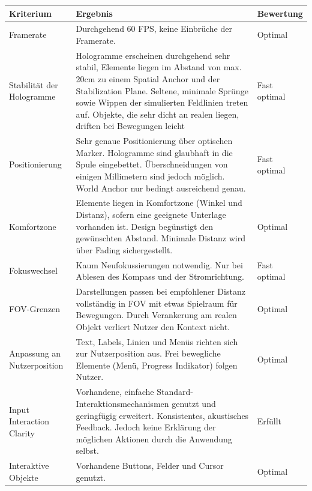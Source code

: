 \begin{landscape}
	\bgroup
	\setlength\extrarowheight{-2pt}
	\def\arraystretch{1.8}
	\begin{table}
		\centering
		\begin{tabular}{m{2.3cm}|m{15.5cm}|m{2cm}}
			Kriterium & Ergebnis & Bewertung\\
			\hline
			\hline
			Framerate & Durchgehend 60 FPS, keine Einbrüche der Framerate. & Optimal\\
			\hline
			Stabilität der Hologramme & Hologramme erscheinen durchgehend sehr stabil, Elemente liegen im Abstand von max. 20cm zu einem Spatial Anchor und der Stabilization Plane. Seltene, minimale Sprünge sowie Wippen der simulierten Feldlinien treten auf. Objekte, die sehr dicht an realen liegen, driften bei Bewegungen leicht & Fast optimal\\
			\hline
			Positionierung & Sehr genaue Positionierung über optischen Marker. Hologramme sind glaubhaft in die Spule eingebettet. Überschneidungen von einigen Millimetern sind jedoch möglich. World Anchor nur bedingt ausreichend genau.& Fast optimal\\
			\hline
			Komfortzone & Elemente liegen in Komfortzone (Winkel und Distanz), sofern eine geeignete Unterlage vorhanden ist. Design begünstigt den gewünschten Abstand. Minimale Distanz wird über Fading sichergestellt. & Optimal\\
			\hline
			Fokuswechsel & Kaum Neufokussierungen notwendig. Nur bei Ablesen des Kompass und der Stromrichtung. & Fast optimal\\
			\hline
			FOV-Grenzen & Darstellungen passen bei empfohlener Distanz vollständig in FOV mit etwas Spielraum für Bewegungen. Durch Verankerung am realen Objekt verliert Nutzer den Kontext nicht. & Optimal\\
			\hline
			Anpassung an Nutzerposition & Text, Labels, Linien und Menüs richten sich zur Nutzerposition aus. Frei bewegliche Elemente (Menü, Progress Indikator) folgen Nutzer. & Optimal\\
			\hline
			Input Interaction Clarity & Vorhandene, einfache Standard-Interaktionsmechanismen genutzt und geringfügig erweitert. Konsistentes, akustisches Feedback. Jedoch keine Erklärung der möglichen Aktionen durch die Anwendung selbst. & Erfüllt\\
			\hline
			Interaktive Objekte & Vorhandene Buttons, Felder und Cursor genutzt. & Optimal\\

\end{tabular}
\end{table}
\end{landscape}
